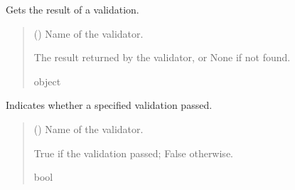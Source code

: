 \documentclass[letterpaper,10pt,english]{sphinxmanual}
\begin{document}
\begin{fulllineitems}
\begin{fulllineitems}
\label{\detokenize{apache_commons_validator_python:apache_commons_validator_python.validator_result_new.ValidatorResult.get_result}}
\pysigstartsignatures
{}
\pysigstopsignatures
\sphinxAtStartPar
Gets the result of a validation.
\begin{quote}\begin{description}
\sphinxAtStartPar
{} () \textendash{} Name of the validator.

\sphinxAtStartPar
The result returned by the validator, or None if not found.

\sphinxAtStartPar
object

\end{description}\end{quote}

\end{fulllineitems}


\begin{fulllineitems}
\label{\detokenize{apache_commons_validator_python:apache_commons_validator_python.validator_result_new.ValidatorResult.is_valid}}
\pysigstartsignatures
{}
\pysigstopsignatures
\sphinxAtStartPar
Indicates whether a specified validation passed.
\begin{quote}\begin{description}
\sphinxAtStartPar
{} () \textendash{} Name of the validator.

\sphinxAtStartPar
True if the validation passed; False otherwise.

\sphinxAtStartPar
bool


\end{description}
\end{quote}
\end{fulllineitems}
\end{fulllineitems}
\end{document}
